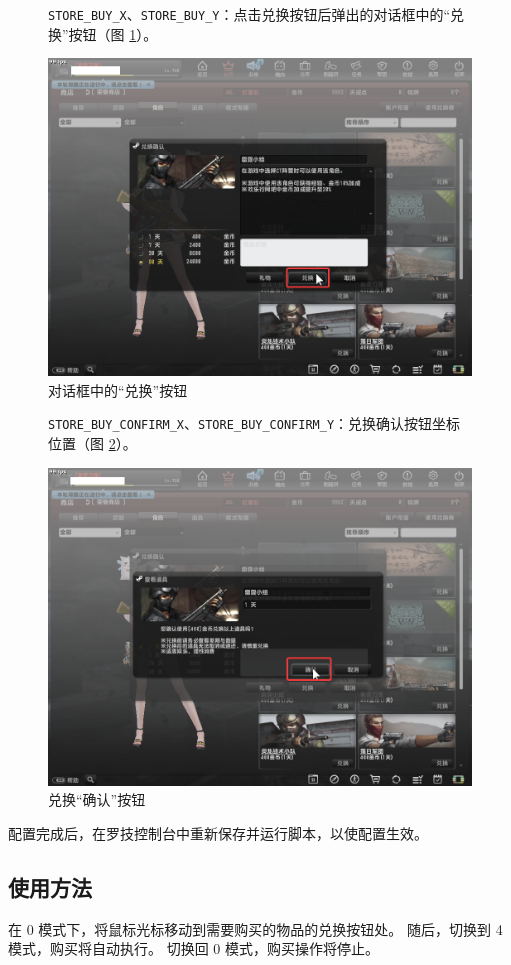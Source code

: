 \begin{figure}[H]
    \Centering
    \parbox[l]{\textwidth}{\lstinline{STORE_BUY_X}、\lstinline{STORE_BUY_Y}：点击兑换按钮后弹出的对话框中的“兑换”按钮（图 \ref{ch4fig-store-purchase}）。}
    \includegraphics[width=\textwidth]{docs/assets/store_purchase.png}
    \caption{对话框中的“兑换”按钮}
    \label{ch4fig-store-purchase}
\end{figure}

\begin{figure}[H]
    \Centering
    \parbox[l]{\textwidth}{\lstinline{STORE_BUY_CONFIRM_X}、\lstinline{STORE_BUY_CONFIRM_Y}：兑换确认按钮坐标位置（图 \ref{ch4fig-buy-confirm}）。}
    \includegraphics[width=\textwidth]{docs/assets/store_buy_confirm.png}
    \caption{兑换“确认”按钮}
    \label{ch4fig-buy-confirm}
\end{figure}

配置完成后，在罗技控制台中重新保存并运行脚本，以使配置生效。

\subsection{使用方法}

在 0 模式下，将鼠标光标移动到需要购买的物品的兑换按钮处。
随后，切换到 4 模式，购买将自动执行。
切换回 0 模式，购买操作将停止。